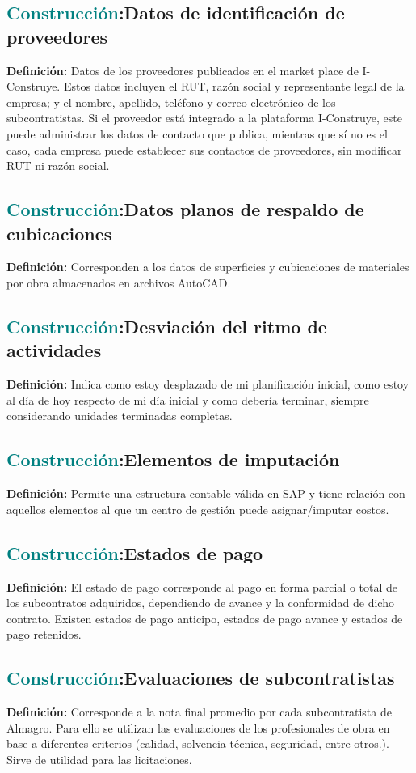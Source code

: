 \documentclass[12pt]{article}
\begin{document}
\subsection{\textcolor{teal}{Construcción}:{Datos de identificación de proveedores}}
\textbf{Definición:} Datos de los proveedores publicados en el market place de I-Construye. Estos datos incluyen el RUT, razón social y representante legal de la empresa; y el nombre, apellido, teléfono y correo electrónico de los subcontratistas. Si el proveedor está integrado a la plataforma I-Construye, este puede administrar los datos de contacto que publica, mientras que sí no es el caso, cada empresa puede establecer sus contactos de proveedores, sin modificar RUT ni razón social.
\subsection{\textcolor{teal}{Construcción}:{Datos planos de respaldo de cubicaciones}}
\textbf{Definición:} Corresponden a los datos de superficies y cubicaciones de materiales por obra almacenados en archivos AutoCAD.
\subsection{\textcolor{teal}{Construcción}:{Desviación del ritmo de actividades}}
\textbf{Definición:} Indica como estoy desplazado de mi planificación inicial, como estoy al día de hoy respecto de mi día inicial y como debería terminar, siempre considerando unidades terminadas completas.
\subsection{\textcolor{teal}{Construcción}:{Elementos de imputación}}
\textbf{Definición:} Permite una estructura contable válida en SAP y tiene relación con aquellos elementos al que un centro de gestión puede asignar/imputar costos.
\subsection{\textcolor{teal}{Construcción}:{Estados de pago}}
\textbf{Definición:} El estado de pago corresponde al pago en forma parcial o total de los subcontratos adquiridos, dependiendo de avance y la conformidad de dicho contrato. Existen estados de pago anticipo, estados de pago avance y estados de pago retenidos.
\subsection{\textcolor{teal}{Construcción}:{Evaluaciones de subcontratistas}}
\textbf{Definición:} Corresponde a la nota final promedio por cada subcontratista de Almagro. Para ello se utilizan las evaluaciones de los profesionales de obra en base a diferentes criterios (calidad, solvencia técnica, seguridad, entre otros.). Sirve de utilidad para las licitaciones.
\end{document}
